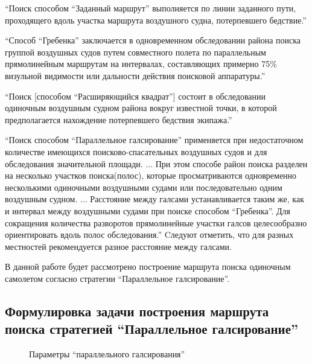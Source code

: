 ``Поиск способом ``Заданный маршрут'' выполняется по линии заданного пути, проходящего вдоль
участка маршрута воздушного судна, потерпевшего бедствие.''

``Способ ``Гребенка'' заключается в одновременном обследовании района поиска группой воздушных судов
путем совместного полета по параллельным прямолинейным маршрутам на интервалах, составляющих
примерно 75\% визульной видимости или дальности действия поисковой аппаратуры.''

``Поиск [способом ``Расширяющийся квадрат''] состоит в обследовании одиночным воздушным судном
района вокруг известной точки, в которой предполагается нахождение потерпевшего бедствия экипажа.''

``Поиск способом ``Параллельное галсирование'' применяется при недостаточном количестве имеющихся
поисково-спасательных воздушных судов и для обследования значительной площади. ... При этом способе
район поиска разделен на несколько участков поиска(полос), которые просматриваются одновременно
несколькими одиночными воздушными судами или последовательно одним воздушным судном. ... Расстояние
между галсами устанавливается таким же, как и интервал между воздушными судами при поиске способом
``Гребенка''. Для сокращения количества разворотов прямолинейные участки галсов целесообразно
 ориентировать вдоль полос обследования.'' Cледуют отметить, что для разных местностей
 рекомендуется разное расстояние между галсами.


В данной работе будет рассмотрено построение маршрута поиска одиночным самолетом согласно
стратегии ``Параллельное галсирование''.

\FloatBarrier
\subsection{Формулировка задачи построения маршрута поиска стратегией
``Параллельное галсирование''}
\begin{figure}
  \caption{Параметры ``параллельного галсирования''}
  \label{tacks-lh}
\end{figure}

